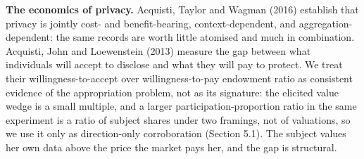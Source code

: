 \documentclass[
  11pt,
]{article}
\begin{document}
\textbf{The economics of privacy.} Acquisti, Taylor and Wagman (2016)
establish that privacy is jointly cost- and benefit-bearing,
context-dependent, and aggregation-dependent: the same records are worth
little atomised and much in combination. Acquisti, John and Loewenstein
(2013) measure the gap between what individuals will accept to disclose
and what they will pay to protect. We treat their willingness-to-accept
over willingness-to-pay endowment ratio as consistent evidence of the
appropriation problem, not as its signature: the elicited value wedge is
a small multiple, and a larger participation-proportion ratio in the
same experiment is a ratio of subject shares under two framings, not of
valuations, so we use it only as direction-only corroboration (Section
5.1). The subject values her own data above the price the market pays
her, and the gap is structural.
\end{document}

